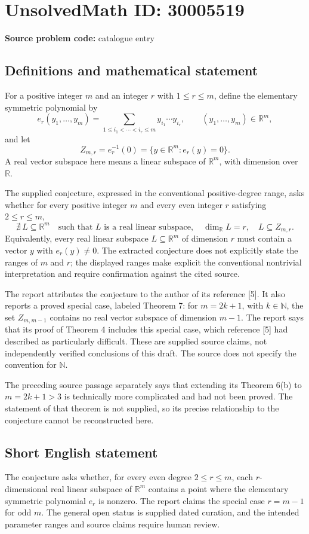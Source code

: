 \documentclass[11pt]{article}
\newcommand{\N}{\mathbb{N}}
\newcommand{\R}{\mathbb{R}}
\begin{document}
\section*{UnsolvedMath ID: 30005519}
\textbf{Source problem code:} catalogue entry
\subsection{Definitions and mathematical statement}
For a positive integer \(m\) and an integer \(r\) with \(1\le r\le m\), define the elementary symmetric polynomial by
\[
e_r(y_1,\ldots,y_m)=\sum_{1\le i_1<\cdots<i_r\le m}y_{i_1}\cdots y_{i_r},
\qquad (y_1,\ldots,y_m)\in\R^m,
\]
and let
\[
Z_{m,r}=e_r^{-1}(0)=\{y\in\R^m:e_r(y)=0\}.
\]
A real vector subspace here means a linear subspace of \(\R^m\), with dimension over \(\R\).

The supplied conjecture, expressed in the conventional positive-degree range, asks whether for every positive integer \(m\) and every even integer \(r\) satisfying \(2\le r\le m\),
\[
\nexists\,L\subseteq\R^m\quad\text{such that }L\text{ is a real linear subspace},\quad \dim_{\R}L=r,\quad L\subseteq Z_{m,r}.
\]
Equivalently, every real linear subspace \(L\subseteq\R^m\) of dimension \(r\) must contain a vector \(y\) with \(e_r(y)\ne0\). The extracted conjecture does not explicitly state the ranges of \(m\) and \(r\); the displayed ranges make explicit the conventional nontrivial interpretation and require confirmation against the cited source.

The report attributes the conjecture to the author of its reference [5]. It also reports a proved special case, labeled Theorem 7: for \(m=2k+1\), with \(k\in\N\), the set \(Z_{m,m-1}\) contains no real vector subspace of dimension \(m-1\). The report says that its proof of Theorem 4 includes this special case, which reference [5] had described as particularly difficult. These are supplied source claims, not independently verified conclusions of this draft. The source does not specify the convention for \(\N\).

The preceding source passage separately says that extending its Theorem 6(b) to \(m=2k+1>3\) is technically more complicated and had not been proved. The statement of that theorem is not supplied, so its precise relationship to the conjecture cannot be reconstructed here.
\subsection{Short English statement}
The conjecture asks whether, for every even degree \(2\le r\le m\), each \(r\)-dimensional real linear subspace of \(\R^m\) contains a point where the elementary symmetric polynomial \(e_r\) is nonzero. The report claims the special case \(r=m-1\) for odd \(m\). The general open status is supplied dated curation, and the intended parameter ranges and source claims require human review.
\end{document}
